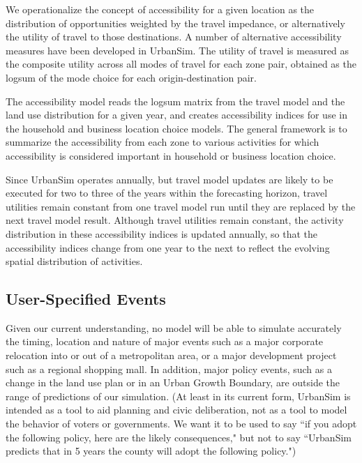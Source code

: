 We operationalize the concept of accessibility for a given
location as the distribution of opportunities weighted by the
travel impedance, or alternatively the utility of travel to those
destinations.  A number of alternative accessibility measures have
been developed in UrbanSim. The utility of travel is measured as the composite
utility across all modes of travel for each zone pair, obtained as
the logsum of the mode choice for each origin-destination pair.

The accessibility model reads the logsum matrix from the travel
model and the land use distribution for a given year, and creates
accessibility indices for use in the household and business
location choice models. The general framework is to summarize the
accessibility from each zone to various activities for which
accessibility is considered important in household or business
location choice.

Since UrbanSim operates annually, but travel model updates are
likely to be executed for two to three of the years within the
forecasting horizon, travel utilities remain constant from one
travel model run until they are replaced by the next travel model
result. Although travel utilities remain constant, the activity
distribution in these accessibility indices is updated annually,
so that the accessibility indices change from one year to the next
to reflect the evolving spatial distribution of activities.

\subsection{User-Specified Events}

Given our current understanding, no model will be able to simulate
accurately the timing, location and nature of major events such as
a major corporate relocation into or out of a metropolitan area,
or a major development project such as a regional shopping mall.
In addition, major policy events, such as a change in the land use
plan or in an Urban Growth Boundary, are outside the range of
predictions of our simulation.  (At least in its current form,
UrbanSim is intended as a tool to aid planning and civic
deliberation, not as a tool to model the behavior of voters or
governments.  We want it to be used to say ``if you adopt the
following policy, here are the likely consequences," but not to
say ``UrbanSim predicts that in 5 years the county will adopt the
following policy.")


